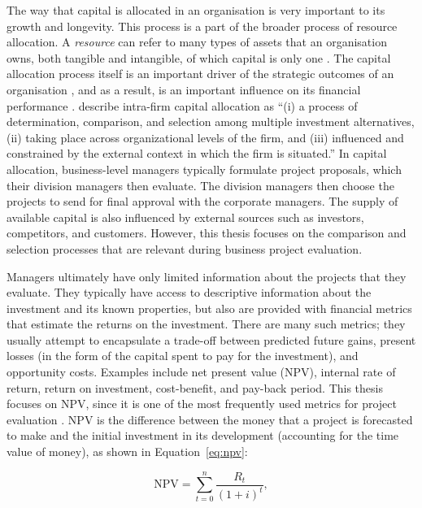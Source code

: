 \documentclass[a4paper, nobind]{templates/ociamthesis}
\theoremstyle{definition}
\theoremstyle{definition}
\theoremstyle{definition}
\theoremstyle{definition}
\theoremstyle{remark}
\begin{document}
The way that capital is allocated in an organisation is very important to its
growth and longevity. This process is a part of the broader process of resource
allocation. A \emph{resource} can refer to many types of assets that an organisation
owns, both tangible and intangible, of which capital is only one
\autocite{wernerfelt1984}. The capital allocation process itself is an important driver
of the strategic outcomes of an organisation \autocite{bower1970,bower2005}, and as a
result, is an important influence on its financial performance \autocites[e.g.,][]{arrfelt2015,bardolet2010}. \textcite[p.~72]{sengul2019} describe intra-firm capital
allocation as ``(i) a process of determination, comparison, and selection among
multiple investment alternatives, (ii) taking place across organizational levels
of the firm, and (iii) influenced and constrained by the external context in
which the firm is situated.'' In capital allocation, business-level managers
typically formulate project proposals, which their division managers then
evaluate. The division managers then choose the projects to send for final
approval with the corporate managers. The supply of available capital is also
influenced by external sources such as investors, competitors, and customers.
However, this thesis focuses on the comparison and selection processes that are
relevant during business project evaluation.

Managers ultimately have only limited information about the projects that they
evaluate. They typically have access to descriptive information about the
investment and its known properties, but also are provided with financial
metrics that estimate the returns on the investment. There are many such
metrics; they usually attempt to encapsulate a trade-off between predicted
future gains, present losses (in the form of the capital spent to pay for the
investment), and opportunity costs. Examples include net present value (NPV),
internal rate of return, return on investment, cost-benefit, and pay-back
period. This thesis focuses on NPV, since it is one of the most frequently used
metrics for project evaluation \autocite{graham2001,remer1993,graham2015}. NPV is
the difference between the money that a project is forecasted to make and the
initial investment in its development (accounting for the time value of money),
as shown in Equation~\eqref{eq:npv}:

\begin{equation}
\text{NPV}=\sum_{t=0}^n \frac{R_t}{(1+i)^t}, \label{eq:npv}
\end{equation}
\end{document}
